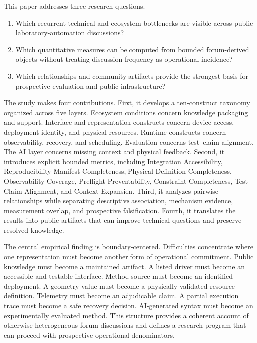 This paper addresses three research questions.
\begin{enumerate}[label=\textbf{RQ\arabic*.}]
  \item Which recurrent technical and ecosystem bottlenecks are visible across public laboratory-automation discussions?
  \item Which quantitative measures can be computed from bounded forum-derived objects without treating discussion frequency as operational incidence?
  \item Which relationships and community artifacts provide the strongest basis for prospective evaluation and public infrastructure?
\end{enumerate}

The study makes four contributions. First, it develops a ten-construct taxonomy organized across five layers. Ecosystem conditions concern knowledge packaging and support. Interface and representation constructs concern device access, deployment identity, and physical resources. Runtime constructs concern observability, recovery, and scheduling. Evaluation concerns test--claim alignment. The AI layer concerns missing context and physical feedback. Second, it introduces explicit bounded metrics, including Integration Accessibility, Reproducibility Manifest Completeness, Physical Definition Completeness, Observability Coverage, Preflight Preventability, Constraint Completeness, Test--Claim Alignment, and Context Expansion. Third, it analyzes pairwise relationships while separating descriptive association, mechanism evidence, measurement overlap, and prospective falsification. Fourth, it translates the results into public artifacts that can improve technical questions and preserve resolved knowledge.

The central empirical finding is boundary-centered. Difficulties concentrate where one representation must become another form of operational commitment. Public knowledge must become a maintained artifact. A listed driver must become an accessible and testable interface. Method source must become an identified deployment. A geometry value must become a physically validated resource definition. Telemetry must become an adjudicable claim. A partial execution trace must become a safe recovery decision. AI-generated syntax must become an experimentally evaluated method. This structure provides a coherent account of otherwise heterogeneous forum discussions and defines a research program that can proceed with prospective operational denominators.
